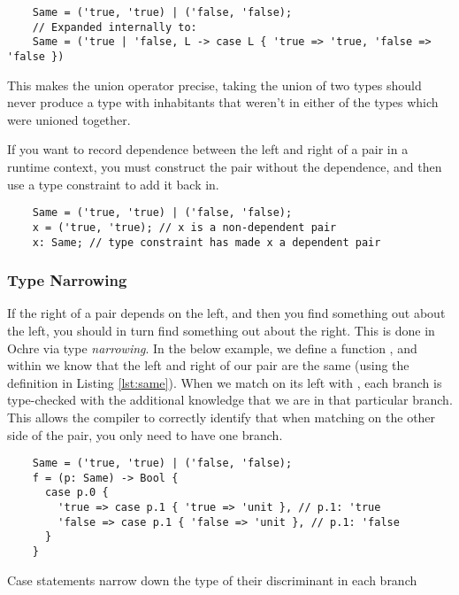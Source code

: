 \documentclass[12pt,twoside]{report}
\begin{document}
\begin{listing}[H]
  \begin{verbatim}
    Same = ('true, 'true) | ('false, 'false);
    // Expanded internally to:
    Same = ('true | 'false, L -> case L { 'true => 'true, 'false => 'false })
  \end{verbatim}
  \caption{}
  \label{lst:same}
\end{listing}

This makes the union operator precise, taking the union of two types should never produce a type with inhabitants that weren't in either of the types which were unioned together.

If you want to record dependence between the left and right of a pair in a runtime context, you must construct the pair without the dependence, and then use a type constraint to add it back in.

\begin{listing}[H]
  \begin{verbatim}
    Same = ('true, 'true) | ('false, 'false);
    x = ('true, 'true); // x is a non-dependent pair
    x: Same; // type constraint has made x a dependent pair
  \end{verbatim}
\end{listing}

\subsubsection{Type Narrowing}
If the right of a pair depends on the left, and then you find something out about the left, you should in turn find something out about the right. This is done in Ochre via type \textit{narrowing}. In the below example, we define a function , and within  we know that the left and right of our pair  are the same (using the definition in Listing \ref{lst:same}). When we match on its left with , each branch is type-checked with the additional knowledge that we are in that particular branch. This allows the compiler to correctly identify that when matching on the other side of the pair, you only need to have one branch.

\begin{listing}[H]
  \begin{verbatim}
    Same = ('true, 'true) | ('false, 'false);
    f = (p: Same) -> Bool {
      case p.0 {
        'true => case p.1 { 'true => 'unit }, // p.1: 'true
        'false => case p.1 { 'false => 'unit }, // p.1: 'false
      }
    }
  \end{verbatim}
  \caption{Case statements narrow down the type of their discriminant in each branch}
\end{listing}
\end{document}

